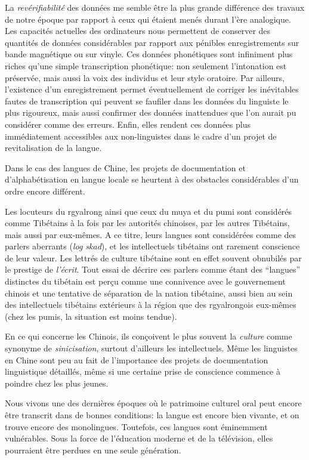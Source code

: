 \documentclass[oldfontcommands,oneside,a4paper,11pt]{memoir}
\begin{document}
La \textit{revérifiabilité} des données me semble être la plus grande différence des travaux de notre époque par rapport à ceux qui étaient menés durant l'ère analogique. Les capacités actuelles des ordinateurs nous permettent de conserver des quantités de données considérables par rapport aux pénibles enregistrements sur bande magnétique ou sur vinyle. Ces données phonétiques sont infiniment plus riches qu'une simple transcription phonétique: non seulement l'intonation est préservée, mais aussi la voix des individus et leur style oratoire. Par ailleurs, l'existence d'un enregistrement permet éventuellement de corriger les inévitables fautes de transcription qui peuvent se faufiler dans les données  du linguiste le plus rigoureux, mais aussi confirmer des données inattendues que l'on aurait pu considérer comme des erreurs. Enfin, elles rendent ces données plus immédiatement accessibles aux non-linguistes dans le cadre d'un projet de revitalisation de la langue.




Dans le cas des langues de Chine, les projets de documentation et d'alphabétisation en langue locale se heurtent à des obstacles considérables d'un ordre encore différent.

Les locuteurs du rgyalrong ainsi que ceux du muya et du pumi sont considérés comme Tibétains à la fois par les autorités chinoises, par les autres Tibétains, mais aussi par eux-mêmes. A ce titre, leurs langues sont considérées comme des parlers aberrants (\textit{log skad}), et les intellectuels tibétains ont rarement conscience de leur valeur. Les lettrés de culture tibétaine sont en effet souvent obnubilés par le prestige de \textit{l'écrit}. Tout essai de décrire ces parlers comme étant des ``langues'' distinctes du tibétain est perçu comme une connivence avec le gouvernement chinois et une tentative de séparation de la nation tibétaine, aussi bien au sein des intellectuels tibétains extérieurs à la région que des rgyalrongois eux-mêmes (chez les pumis, la situation est moins tendue).

En ce qui concerne les Chinois,  ils conçoivent le plus souvent la \textit{culture} comme synonyme de \textit{sinicisation}, surtout d'ailleurs les intellectuels. Même les linguistes en Chine sont peu au fait de l'importance des projets de documentation linguistique détaillés, même si une certaine prise de conscience commence à poindre chez les plus jeunes.

Nous vivons une des dernières époques où le patrimoine culturel oral peut encore être transcrit dans de bonnes conditions: la langue est encore bien vivante, et on  trouve encore des monolingues. Toutefois, ces langues sont éminemment vulnérables. Sous la force de l'éducation moderne et de la télévision, elles pourraient être perdues en une seule génération. 
\end{document}

